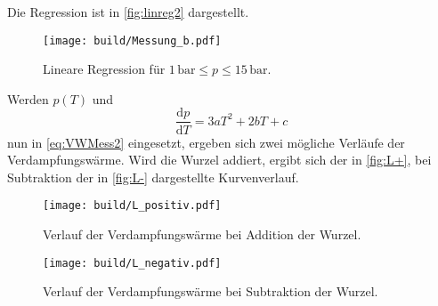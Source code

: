 Die Regression ist in \autoref{fig:linreg2} dargestellt.

\begin{figure}
  \centering
  \texttt{[image: build/Messung\_b.pdf]}
  \caption{Lineare Regression für $1 \,\unit{\bar} \leq p \leq 15 \,\unit{\bar}$.}
  \label{fig:linreg2}
\end{figure}

Werden $p(T)$ und 
\begin{equation*}
  \frac{\mathrm{d}p}{\mathrm{d}T} = 3 a T^2 + 2 b T + c
\end{equation*} nun in \eqref{eq:VWMess2} eingesetzt, ergeben sich zwei mögliche Verläufe der 
Verdampfungswärme.
Wird die Wurzel addiert, ergibt sich der in \autoref{fig:L+}, bei Subtraktion der
in \autoref{fig:L-} dargestellte Kurvenverlauf.

\begin{figure}
  \centering
  \texttt{[image: build/L\_positiv.pdf]}
  \caption{Verlauf der Verdampfungswärme bei Addition der Wurzel.}
  \label{fig:L+}
\end{figure}

\begin{figure}
  \centering
  \texttt{[image: build/L\_negativ.pdf]}
  \caption{Verlauf der Verdampfungswärme bei Subtraktion der Wurzel.}
  \label{fig:L-}
\end{figure}





